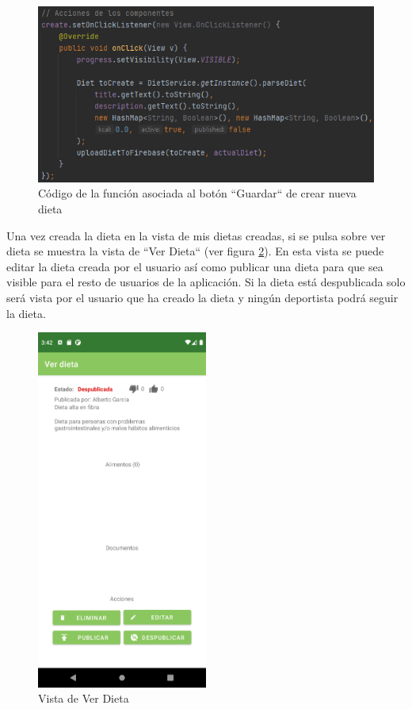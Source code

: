 \begin{figure}[H]
    \centering
    \includegraphics[width=\textwidth]{Images/Capitulo7/createbtn.png}
        \caption{Código de la función asociada al botón ``Guardar`` de crear nueva dieta}
    \label{fig:createbtn}
\end{figure}

Una vez creada la dieta en la vista de mis dietas creadas, si se pulsa sobre ver dieta se muestra la vista de ``Ver Dieta`` (ver figura \ref{fig:verdieta}). En esta vista se puede editar la dieta creada por el usuario así como publicar una dieta para que sea visible para el resto de usuarios de la aplicación. Si la dieta está despublicada solo será vista por el usuario que ha creado la dieta y ningún deportista podrá seguir la dieta.

\begin{figure}[H]
    \centering
    \includegraphics[width=0.5\textwidth]{Images/Capitulo7/verdieta.png}
        \caption{Vista de Ver Dieta}
    \label{fig:verdieta}
\end{figure}


